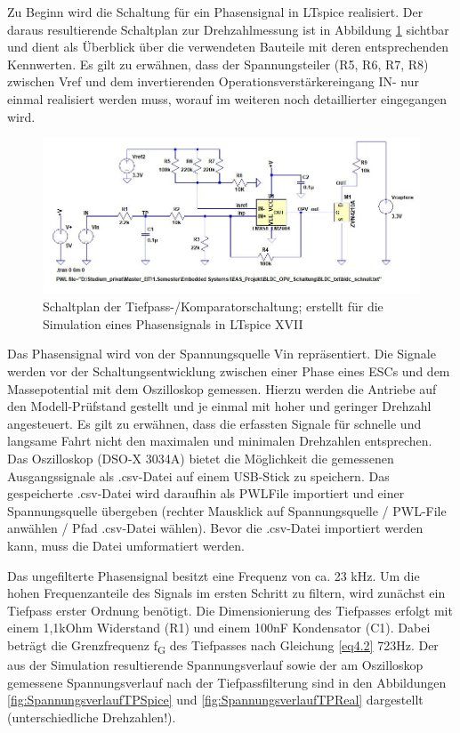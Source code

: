 Zu Beginn wird die Schaltung für ein Phasensignal in LTspice realisiert. Der daraus resultierende Schaltplan zur Drehzahlmessung ist in Abbildung \ref{fig:Schaltungsaufbau} sichtbar und dient als Überblick über die verwendeten Bauteile mit deren entsprechenden Kennwerten. Es gilt zu erwähnen, dass der Spannungsteiler (R5, R6, R7, R8) zwischen Vref und dem invertierenden Operationsverstärkereingang IN- nur einmal realisiert werden muss, worauf im weiteren noch detaillierter eingegangen wird.

\begin{figure}[H] %
\includegraphics[width=.95\textwidth]{sec4/images/Schaltungsaufbau} 
\centering
\captionsetup{width=.95\textwidth}
\caption[Schaltplan der Tiefpass-/Komparatorschaltung aus LTspice XVII]{Schaltplan der Tiefpass-/Komparatorschaltung; erstellt für die Simulation eines Phasensignals in LTspice XVII}\centering
\label{fig:Schaltungsaufbau}
\end{figure}

Das Phasensignal wird von der Spannungsquelle Vin repräsentiert. Die Signale werden vor der Schaltungsentwicklung zwischen einer Phase eines ESCs und dem Massepotential mit dem Oszilloskop gemessen. Hierzu werden die Antriebe auf den Modell-Prüfstand gestellt und je einmal mit hoher und geringer Drehzahl angesteuert. Es gilt zu erwähnen, dass die erfassten Signale für schnelle und langsame Fahrt nicht den maximalen und minimalen Drehzahlen entsprechen. Das Oszilloskop (DSO-X 3034A) bietet die Möglichkeit die gemessenen Ausgangssignale als .csv-Datei auf einem USB-Stick zu speichern. Das gespeicherte .csv-Datei wird daraufhin als \ac{PWLFile} importiert und einer Spannungsquelle übergeben (rechter Mausklick auf Spannungsquelle / PWL-File anwählen / Pfad .csv-Datei wählen). Bevor die .csv-Datei importiert werden kann, muss die Datei umformatiert werden.\vspace{11pt}

Das ungefilterte Phasensignal besitzt eine Frequenz von ca. 23 kHz. Um die hohen Frequenzanteile des Signals im ersten Schritt zu filtern, wird zunächst ein Tiefpass erster Ordnung benötigt. Die Dimensionierung des Tiefpasses erfolgt mit einem 1,1kOhm Widerstand (R1) und einem 100nF Kondensator (C1). Dabei beträgt die Grenzfrequenz f\textsubscript{G} des Tiefpasses nach Gleichung \ref{eq4.2} 723Hz. Der aus der Simulation resultierende Spannungsverlauf sowie der am Oszilloskop gemessene Spannungsverlauf nach der Tiefpassfilterung sind in den Abbildungen \ref{fig:SpannungsverlaufTPSpice} und \ref{fig:SpannungsverlaufTPReal} dargestellt (unterschiedliche Drehzahlen!).

